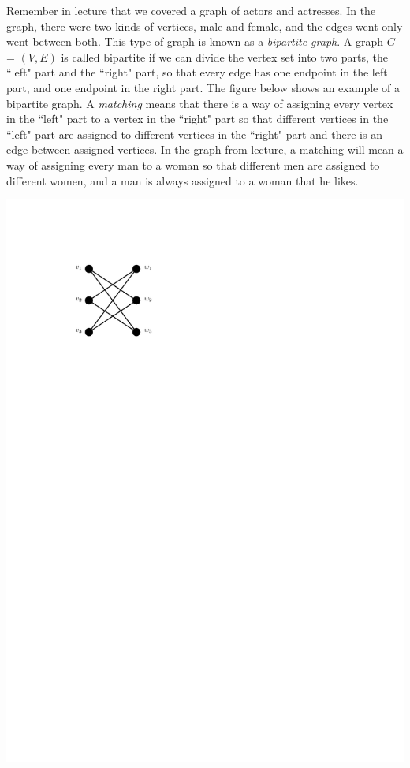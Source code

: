 \documentclass[12pt]{article}
\begin{document}
Remember in lecture that we covered a graph of actors and actresses. In the graph, there
were two kinds of vertices, male and female, and the edges went only went between both.
This type of graph is known as a {\em bipartite graph}. A graph $G$ = $(V, E)$ is called bipartite if we can divide the vertex set into two parts, the ``left" part and the ``right" part, so that every edge has one endpoint in the left part, and
one endpoint in the right part. The figure below shows an example of a bipartite graph. A {\em matching} means that there is a way of assigning every vertex in the ``left" part to a vertex in the ``right" part so that different vertices in the ``left" part are assigned to different vertices in the ``right" part and there is an edge between assigned vertices. In the graph from lecture, a matching will mean a way of assigning every man to a woman so that different men are assigned to different women, and a man is always assigned to a woman that he likes.
\begin{center}
    \includegraphics[scale=1.3]{bipartite}
\end{center}
\end{document}
